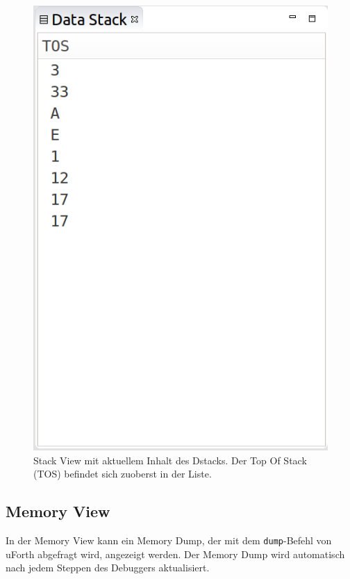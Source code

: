 \begin{figure}[H]
	\centering
		\includegraphics[scale=0.35]{debugger/stack.png}
		\caption{Stack View mit aktuellem Inhalt des Dstacks. Der Top Of Stack (TOS) befindet sich zuoberst in der Liste.}
		\label{fig:stack}
\end{figure}


\subsection{Memory View}

In der Memory View kann ein Memory Dump, der mit dem \verb!dump!-Befehl von uForth abgefragt wird, angezeigt werden. Der Memory Dump wird automatisch nach jedem Steppen des Debuggers aktualisiert.

